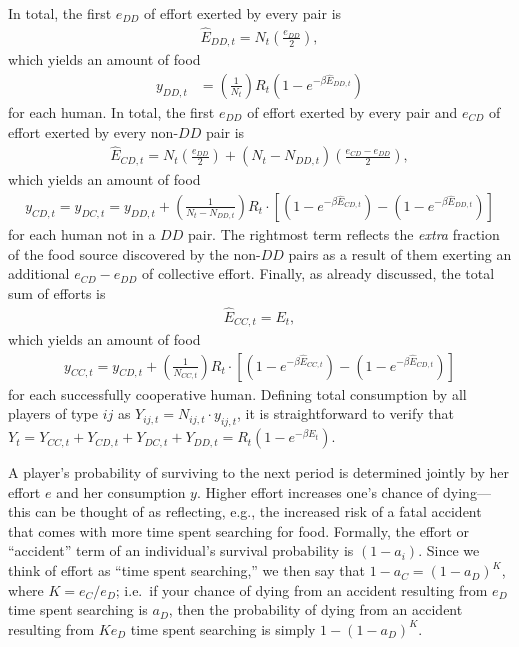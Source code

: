 \documentclass[12pt,reqno]{amsart}
\begin{document}
In total, the first $e_{DD}$ of effort exerted by every pair is 
\begin{align*} \label{}
\hat{E}_{DD,t} = N_t \left(\frac{e_{DD}}{2}\right),
\end{align*}
which yields an amount of food
\begin{align*} \label{}
y_{DD,t} &= \left(\frac{1}{N_t}\right) R_t \left(1 - e^{-\beta \hat{E}_{DD,t}}\right)
\end{align*}
for each human. In total, the first $e_{DD}$ of effort exerted by every pair and $e_{CD}$ of effort exerted by every non-$DD$ pair is
\begin{align*} \label{}
\hat{E}_{CD,t} = N_t \left(\frac{e_{DD}}{2}\right) + (N_t - N_{DD,t})\left(\frac{e_{CD} - e_{DD}}{2}\right),
\end{align*}
which yields an amount of food
\begin{align*} \label{}
y_{CD,t} = y_{DC,t} = y_{DD,t} + \left(\frac{1}{N_t - N_{DD,t}}\right) R_t \cdot \left[\left(1 - e^{-\beta \hat{E}_{CD,t}}\right) - \left(1 - e^{-\beta \hat{E}_{DD,t}}\right)\right]
\end{align*}
for each human not in a $DD$ pair. The rightmost term reflects the \emph{extra} fraction of the food source discovered by the non-$DD$ pairs as a result of them exerting an additional $e_{CD} - e_{DD}$ of collective effort. Finally, as already discussed, the total sum of efforts is
\begin{align*} \label{}
\hat{E}_{CC,t} = E_t,
\end{align*}
which yields an amount of food
\begin{align*} \label{}
y_{CC,t} = y_{CD,t} + \left(\frac{1}{N_{CC,t}}\right) R_t \cdot \left[\left(1 - e^{-\beta \hat{E}_{CC,t}}\right) - \left(1 - e^{-\beta \hat{E}_{CD,t}}\right)\right]
\end{align*}
for each successfully cooperative human. Defining total consumption by all players of type $ij$ as $Y_{ij,t} = N_{ij,t} \cdot y_{ij,t}$, it is straightforward to verify that $Y_t = Y_{CC,t} + Y_{CD,t} + Y_{DC,t} + Y_{DD,t} = R_t(1-e^{-\beta E_t})$.

A player's probability of surviving to the next period is determined jointly by her effort $e$ and her consumption $y$. Higher effort increases one's chance of dying---this can be thought of as reflecting, e.g., the increased risk of a fatal accident that comes with more time spent searching for food. Formally, the effort or ``accident'' term of an individual's survival probability is $(1 - a_i)$. Since we think of effort as ``time spent searching,'' we then say that $1 - a_C = (1 - a_D)^K$, where $K = e_C/e_D$; i.e.\ if your chance of dying from an accident resulting from $e_D$ time spent searching is $a_D$, then the probability of dying from an accident resulting from $Ke_D$ time spent searching is simply $1 - (1-a_D)^K$. 
\end{document}

